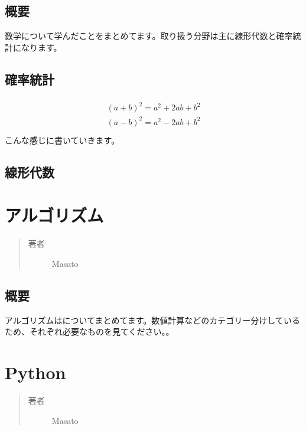 \documentclass[letterpaper,10pt,dvipdfmx]{sphinxmanual}
\begin{document}
\section{概要}
\label{learned_math:id2}
数学について学んだことをまとめてます。取り扱う分野は主に線形代数と確率統計になります。


\section{確率統計}
\label{learned_math:id3}\begin{align*}\!\begin{aligned}
(a + b)^2 = a^2 + 2ab + b^2\\
(a - b)^2 = a^2 - 2ab + b^2\\
\end{aligned}\end{align*}
こんな感じに書いていきます。


\section{線形代数}
\label{learned_math:id4}

\chapter{アルゴリズム}
\label{learned_algorithm:id1}\label{learned_algorithm::doc}\begin{quote}\begin{description}
\item[{著者}] \leavevmode
Masato

\end{description}\end{quote}


\section{概要}
\label{learned_algorithm:id2}
アルゴリズムはについてまとめてます。数値計算などのカテゴリー分けしているため、それぞれ必要なものを見てください。。


\chapter{Python}
\label{learned_programing_python:python}\label{learned_programing_python::doc}\begin{quote}\begin{description}
\item[{著者}] \leavevmode
Masato

\end{description}\end{quote}
\end{document}
